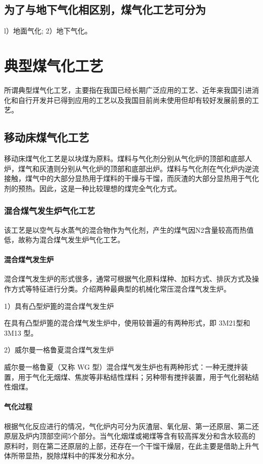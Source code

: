 \documentclass[10pt,openany]{ctexbook}
\begin{document}
\subsection{为了与地下气化相区别，煤气化工艺可分为}
l）地面气化;
2）地下气化。
\section{典型煤气化工艺}
所谓典型煤气化工艺，主要指在我国已经长期广泛应用的工艺、近年来我国引进消化和自行开发并已得到应用的工艺以及我国目前尚未使用但却有较好发展前景的工艺。
\subsection{移动床煤气化工艺}
    移动床煤气化工艺是以块煤为原料。煤料与气化剂分别从气化炉的顶部和底部人炉，煤气和灰渣则分别从气化炉的顶部和底部出炉。煤料与气化剂在气化炉内逆流接触，煤气中的大部分显热用于煤料的干燥与干馏，而灰渣的大部分显热用于气化剂的预热。因此，这是一种比较理想的煤完全气化方式。
    \subsubsection{混合煤气发生炉气化工艺}
    该工艺是以空气与水蒸气的混合物作为气化剂，产生的煤气因N2含量较高而热值低，故称为混合煤气发生炉气化工艺。
\paragraph{混合煤气发生炉}
混合煤气发生炉的形式很多，通常可根据气化原料煤种、加料方式、排灰方式及操作方式等特征进行分类。介绍两种最典型的机械化常压混合煤气发生炉。\par
   1）具有凸型炉篦的混合煤气发生炉\par
    在具有凸型炉篦的混合煤气发生炉中，使用较普遍的有两种形式，即 3M21型和 3M13 型。\par
  2）威尔曼一格鲁夏混合煤气发生炉\par
    威尔曼一格鲁夏（又称 WG 型）混合煤气发生炉也有两种形式：一种无搅拌装置，用于气化无烟煤、焦炭等非粘结性煤料；另种带有搅拌装置，用于气化弱粘结性烟煤。\par
\paragraph{气化过程}
根据气化反应进行的情况，气化炉内可分为灰渣层、氧化层、第一还原层、第二还原层及炉内顶部空间5个部分。当气化烟煤或褐煤等含有较高挥发分和含水较高的原料时，则在第二还原层的上部，还存在一个干馏干燥层，在此主要是借助上升气体所带显热，脱除煤料中的挥发分和水分。
\end{document}
